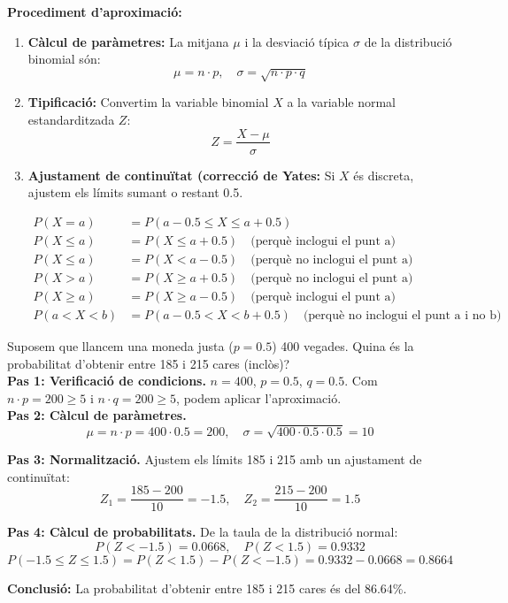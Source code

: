 \documentclass[12pt]{article}
\begin{document}
\begin{concept}[title=Procediment] \noindent
\textbf{Procediment d'aproximació:}
\begin{enumerate}
    \item \textbf{Càlcul de paràmetres:} La mitjana $\mu$ i la desviació típica $\sigma$ de la distribució binomial són:
    \[
    \mu = n \cdot p, \quad \sigma = \sqrt{n \cdot p \cdot q}
    \]
    \item \textbf{Tipificació:} Convertim la variable binomial $X$ a la variable normal estandarditzada $Z$:
    \[
    Z = \frac{X - \mu}{\sigma}
    \]
    \item \textbf{Ajustament de continuïtat (correcció de Yates:} Si $X$ és discreta, ajustem els límits sumant o restant 0.5.
    
\begin{align*}
P(X = a) &= P(a - 0.5 \leq X \leq a + 0.5) \\
P(X \leq a) &= P(X \leq a + 0.5) \quad \text{(perquè inclogui el punt a)} \\
P(X \leq a) &= P(X < a - 0.5) \quad \text{(perquè no inclogui el punt a)} \\
P(X > a) &= P(X \geq a + 0.5) \quad \text{(perquè no inclogui el punt a)} \\
P(X \geq a) &= P(X \geq a - 0.5) \quad \text{(perquè inclogui el punt a)} \\
P(a < X < b) &= P(a - 0.5 < X < b + 0.5) \quad \text{(perquè no inclogui el punt a i no b)}
\end{align*}

    
\end{enumerate}
\end{concept}

\begin{exemple}[title=Exemple 1] \noindent 
Suposem que llancem una moneda justa ($p = 0.5$) 400 vegades. Quina és la probabilitat d'obtenir entre 185 i 215 cares (inclòs)?\\

\textbf{Pas 1: Verificació de condicions.} $n = 400$, $p = 0.5$, $q = 0.5$. Com $n \cdot p = 200 \geq 5$ i $n \cdot q = 200 \geq 5$, podem aplicar l'aproximació.\\

\textbf{Pas 2: Càlcul de paràmetres.}
\[
\mu = n \cdot p = 400 \cdot 0.5 = 200, \quad \sigma = \sqrt{400 \cdot 0.5 \cdot 0.5} = 10
\]

\textbf{Pas 3: Normalització.} Ajustem els límits 185 i 215 amb un ajustament de continuïtat:
\[
Z_1 = \frac{185 - 200}{10} = -1.5, \quad Z_2 = \frac{215 - 200}{10} = 1.5
\]

\textbf{Pas 4: Càlcul de probabilitats.} De la taula de la distribució normal:
\[
P(Z < -1.5) = 0.0668, \quad P(Z < 1.5) = 0.9332
\]
\[
P(-1.5 \leq Z \leq 1.5) = P(Z < 1.5) - P(Z < -1.5) = 0.9332 - 0.0668 = 0.8664
\]

\textbf{Conclusió:} La probabilitat d'obtenir entre 185 i 215 cares és del 86.64\%.
\end{exemple}
\end{document}
